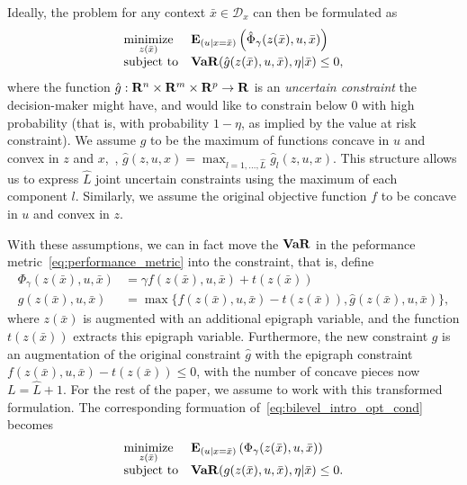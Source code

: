 Ideally, the problem for any context $\bar{x} \in \mathcal{D}_x$ can then be formulated as
\begin{equation}
	\label{eq:bilevel_intro_opt_cond}
	\begin{array}{ll}
		\underset{z(\bar{x})}{\mbox{minimize}} & \mathbf{E}_{(u|x = \bar{x})}\left(\hat{\Phi}_\gamma(z(\bar{x}),u,\bar{x})\right) \\
		\mbox{subject to} & \mathop{\bf VaR}(\hat{g}(z(\bar{x}),u,\bar{x}),\eta|\bar{x}) \leq 0,\\
	\end{array}
\end{equation}
where the function $\hat{g} : {\mathbf R}^n \times {\mathbf R}^m \times {\mathbf R}^{p} \to {\mathbf R}$  is an {\it uncertain constraint} the decision-maker might have, and would like to constrain below 0 with high probability (that is, with probability $1-\eta$, as implied by the value at risk constraint). We assume $\hat{g}$ to be the maximum of functions concave in $u$ and convex in $z$ and $x$,~\eg, $\hat{g}(z, u, x) = \max_{l=1,\dots, \hat{L}} \hat{g}_l(z, u, x)$. This structure allows us to express $\hat{L}$ joint uncertain constraints using the maximum of each component $l$. Similarly, we assume the original objective function $f$ to be concave in $u$ and convex in $z$. 

With these assumptions, we can in fact move the $\mathop{\bf VaR}$ in the peformance metric~\eqref{eq:performance_metric} into the constraint, that is, define 
\begin{align*}
\Phi_\gamma(z(\bar{x}),u,\bar{x}) &= \gamma f(z(\bar{x}),u,\bar{x}) + t(z(\bar{x}))\\
g(z(\bar{x}),u,\bar{x}) &= \max\{f(z(\bar{x}),u,\bar{x}) - t(z(\bar{x})),\hat{g}(z(\bar{x}),u,\bar{x})\},
\end{align*}
where $z(\bar{x})$ is augmented with an additional epigraph variable, and the function $t(z(\bar{x}))$ extracts this epigraph variable. Furthermore, the new constraint $g$ is an augmentation of the original constraint $\hat{g}$ with the epigraph constraint $f(z(\bar{x}),u,\bar{x}) - t(z(\bar{x})) \leq 0$, with the number of concave pieces now $L = \hat{L}+1$.
For the rest of the paper, we assume to work with this transformed formulation. The corresponding formuation of~\eqref{eq:bilevel_intro_opt_cond} becomes
\begin{equation}
	\label{eq:bilevel_intro_opt_cond_new}
	\begin{array}{ll}
		\underset{z(\bar{x})}{\mbox{minimize}} & \mathbf{E}_{(u|x = \bar{x})}\left(\Phi_\gamma(z(\bar{x}),u,\bar{x})\right) \\
		\mbox{subject to} & \mathop{\bf VaR}(g(z(\bar{x}),u,\bar{x}),\eta|\bar{x}) \leq 0.\\
	\end{array}
\end{equation}

